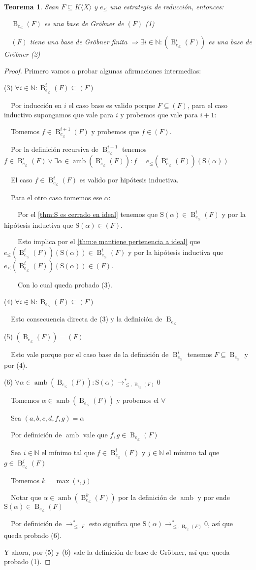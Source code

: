 \documentclass{amsbook}
\theoremstyle{customstyle}
\newtheorem{theorem}{Teorema}[section]
\DeclareMathOperator{\amb}{amb}
\renewcommand{\S}{\text{S}}
\DeclareMathOperator{\B}{B}
\begin{document}
\begin{theorem}
Sean $F ⊆ K⟨X⟩$ y $e_≤$ una estrategia de reducción, entonces:

  $\B_{e_≤}(F)$ es una base de Gröbner de $(F)$ (1)

  $(F)$ tiene una base de Gröbner finita $⇒ ∃i ∈ ℕ : (\B_{e_≤}^i(F))$ es una base de Gröbner (2)
\end{theorem}
\begin{proof}
Primero vamos a probar algunas afirmaciones intermedias:

(3) $∀i ∈ ℕ : \B_{e_≤}^{i}(F) ⊆ (F)$

  Por inducción en $i$ el caso base es valido porque $F ⊆ (F)$, para el caso inductivo supongamos que vale para $i$ y probemos que vale para $i + 1$:

  Tomemos $f ∈ \B_{e_≤}^{i + 1}(F)$ y probemos que $f ∈ (F)$.

  Por la definición recursiva de $\B_{e_≤}^{i + 1}$ tenemos $f ∈ \B_{e_≤}^i(F) ∨ ∃α ∈ \amb(\B_{e_≤}^i(F)) : f = e_≤(\B_{e_≤}^i(F))(\S(α))$

  El caso $f ∈ \B_{e_≤}^i(F)$ es valido por hipótesis inductiva.

  Para el otro caso tomemos ese $α$:

    Por el \cref{thm:S es cerrado en ideal} tenemos que $\S(α) ∈ \B_{e_≤}^i(F)$ y por la hipótesis inductiva que $\S(α) ∈ (F)$.

    Esto implica por el \cref{thm:e mantiene pertenencia a ideal} que $e_≤(\B_{e_≤}^i(F))(\S(α)) ∈ \B_{e_≤}^i(F)$ y por la hipótesis inductiva que $e_≤(\B_{e_≤}^i(F))(\S(α)) ∈ (F)$.

    Con lo cual queda probado (3).

(4) $∀i ∈ ℕ : \B_{e_≤}(F) ⊆ (F)$

  Esto consecuencia directa de (3) y la definición de $\B_{e_≤}$

(5) $(\B_{e_≤}(F)) = (F)$

  Esto vale porque por el caso base de la definición de $\B_{e_≤}^i$ tenemos $F ⊆ \B_{e_≤}$ y por (4).

(6) $∀α ∈ \amb(\B_{e_≤}(F)) : \S(α) →^*_{≤, \B_{e_≤}(F)} 0$

  Tomemos $α ∈ \amb(\B_{e_≤}(F))$ y probemos el $∀$

  Sea $(a, b, c, d, f, g) = α$

  Por definición de $\amb$ vale que $f, g ∈ \B_{e_≤}(F)$

  Sea $i ∈ ℕ$ el mínimo tal que $f ∈ \B_{e_≤}^i(F)$ y $j ∈ ℕ$ el mínimo tal que $g ∈ \B_{e_≤}^j(F)$

  Tomemos $k = \max(i, j)$

  Notar que $α ∈ \amb(\B_{e_≤}^k(F))$ por la definición de $\amb$ y por ende $\S(α) ∈ \B_{e_≤}(F)$

  Por definición de $→^*_{≤, F}$ esto significa que $\S(α) →^*_{≤, \B_{e_≤}(F)} 0$, así que queda probado (6).

Y ahora, por (5) y (6) vale la definición de base de Gröbner, así que queda probado (1).


\end{proof}
\end{document}
